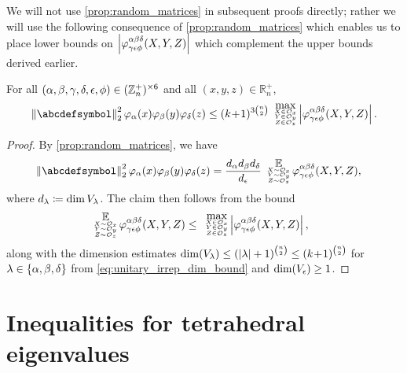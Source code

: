 \documentclass[notitlepage, 11pt, letterpaper]{amsart}
\begin{document}
We will not use \cref{prop:random_matrices} in subsequent proofs directly; rather we will use the following consequence of \cref{prop:random_matrices} which enables us to place lower bounds on $\left|\varphi^{\alpha\beta\delta}_{\gamma\epsilon\phi}(X,Y,Z)\right|$ which complement the upper bounds derived earlier.
\begin{lem}
    \label{lem:estimate_E_x_y_z_bound}
    For all $(\alpha,\beta,\gamma,\delta,\epsilon,\phi) \in (\mathbb Z^{+}_{n})^{\times 6}$ and all $(x,y,z) \in \mathbb R_n^{+}$,
    \begin{equation}
        \norm{\abcdefsymbol}_{2}^{2} \vp_{\ya}(\ex)\vp_{\yb}(\ey)\vp_{\yd}(\ez)
        \leq \polyk{3\binom{n}{2}}
        \tighttriplesubstack{\mathrm{max}}{X \in \orbit_{\ex}}{Y \in \orbit_{\ey}}{Z \in \orbit_{\ez}}
        \abs{\vp^{\ya\yb\yd}_{\yc\ye\yf}(X,Y,Z)}.
    \end{equation}
\end{lem}
\begin{proof}
    By \cref{prop:random_matrices}, we have
    \begin{align}
        \norm{\abcdefsymbol}_{2}^{2} \vp_{\ya}(\ex)\vp_{\yb}(\ey)\vp_{\yd}(\ez)
        &=
        \frac{d_\ya d_\yb d_\yd}{d_\ye}
        \tighttriplesubstack{\expect}{X \sim \orbit_{\ex}}{Y \sim \orbit_{\ey}}{Z \sim \orbit_{\ez}}\,
        \vp^{\ya\yb\yd}_{\yc\ye\yf}(X,Y,Z),
    \end{align}
    where $d_{\lambda} \coloneqq \dim V_{\lambda}$.
    The claim then follows from the bound
    \begin{align}
        \tighttriplesubstack{\expect}{X \sim \orbit_{\ex}}{Y \sim \orbit_{\ey}}{Z \sim \orbit_{\ez}}\,
        \vp^{\ya\yb\yd}_{\yc\ye\yf}(X,Y,Z)
        &\leq
        \tighttriplesubstack{\mathrm{max}}{X \in \orbit_{\ex}}{Y \in \orbit_{\ey}}{Z \in \orbit_{\ez}}
        \abs{\vp^{\ya\yb\yd}_{\yc\ye\yf}(X,Y,Z)},
    \end{align}
    along with the dimension estimates $\dim (V_\lambda) \leq (|\lambda| + 1)^{\binom{n}{2}} \leq (k\!+\!1)^{\binom{n}{2}}$ for $\lambda \in \{\alpha,\beta,\delta\}$ from \cref{eq:unitary_irrep_dim_bound} and $\dim (V_{\epsilon}) \geq 1$.
\end{proof}

\section{Inequalities for tetrahedral eigenvalues}
\label{sec:proof_tet_iff}
\end{document}
